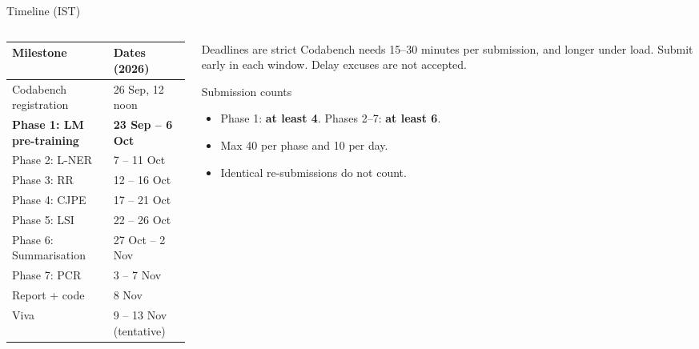 \documentclass[aspectratio=169,11pt]{beamer}
\begin{document}
\begin{frame}{Timeline (IST)}
  \begin{columns}[T]
    \begin{column}{0.5\textwidth}
      \small
      \begin{tabular}{@{}ll@{}}
        \toprule
        Milestone & Dates (2026)\\
        \midrule
        Codabench registration & 26 Sep, 12 noon\\
        \textbf{Phase 1: LM pre-training} & \textbf{23 Sep -- 6 Oct}\\
        Phase 2: L-NER & 7 -- 11 Oct\\
        Phase 3: RR & 12 -- 16 Oct\\
        Phase 4: CJPE & 17 -- 21 Oct\\
        Phase 5: LSI & 22 -- 26 Oct\\
        Phase 6: Summarisation & 27 Oct -- 2 Nov\\
        Phase 7: PCR & 3 -- 7 Nov\\
        Report + code & 8 Nov\\
        Viva & 9 -- 13 Nov (tentative)\\
        \bottomrule
      \end{tabular}
    \end{column}
    \begin{column}{0.46\textwidth}
      \begin{alertblock}{Deadlines are strict}
        \small
        Codabench needs 15--30 minutes per submission, and longer under load.
        Submit early in each window. Delay excuses are not accepted.
      \end{alertblock}
      \begin{block}{Submission counts}
        \small
        \begin{itemize}
          \item Phase 1: \textbf{at least 4}. Phases 2--7: \textbf{at least 6}.
          \item Max 40 per phase and 10 per day.
          \item Identical re-submissions do not count.
        \end{itemize}
      \end{block}
    \end{column}
  \end{columns}
\end{frame}
\end{document}
